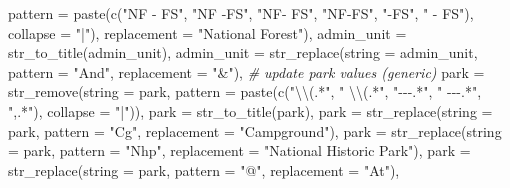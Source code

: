 \documentclass[
]{book}
\newenvironment{Shaded}{\begin{snugshade}}{\end{snugshade}}
\newcommand{\AttributeTok}[1]{\textcolor[rgb]{0.77,0.63,0.00}{#1}}
\newcommand{\CommentTok}[1]{\textcolor[rgb]{0.56,0.35,0.01}{\textit{#1}}}
\newcommand{\FunctionTok}[1]{\textcolor[rgb]{0.00,0.00,0.00}{#1}}
\newcommand{\NormalTok}[1]{#1}
\newcommand{\SpecialCharTok}[1]{\textcolor[rgb]{0.00,0.00,0.00}{#1}}
\newcommand{\StringTok}[1]{\textcolor[rgb]{0.31,0.60,0.02}{#1}}
\begin{document}
\begin{Shaded}
\begin{Highlighting}[]
                             \AttributeTok{pattern =} \FunctionTok{paste}\NormalTok{(}\FunctionTok{c}\NormalTok{(}\StringTok{"NF {-} FS"}\NormalTok{, }\StringTok{"NF {-}FS"}\NormalTok{, }
                                               \StringTok{"NF{-} FS"}\NormalTok{, }\StringTok{"NF{-}FS"}\NormalTok{, }
                                               \StringTok{"{-}FS"}\NormalTok{, }\StringTok{" {-} FS"}\NormalTok{), }
                                             \AttributeTok{collapse =} \StringTok{"|"}\NormalTok{),}
                             \AttributeTok{replacement =} \StringTok{"National Forest"}\NormalTok{),}
    \AttributeTok{admin\_unit =} \FunctionTok{str\_to\_title}\NormalTok{(admin\_unit),}
    \AttributeTok{admin\_unit =} \FunctionTok{str\_replace}\NormalTok{(}\AttributeTok{string =}\NormalTok{ admin\_unit,}
                             \AttributeTok{pattern =} \StringTok{"And"}\NormalTok{,}
                             \AttributeTok{replacement =} \StringTok{"\&"}\NormalTok{),}
    \CommentTok{\# update park values (generic)}
    \AttributeTok{park =} \FunctionTok{str\_remove}\NormalTok{(}\AttributeTok{string =}\NormalTok{ park,}
                      \AttributeTok{pattern =} \FunctionTok{paste}\NormalTok{(}\FunctionTok{c}\NormalTok{(}\StringTok{"}\SpecialCharTok{\textbackslash{}\textbackslash{}}\StringTok{(.*"}\NormalTok{, }\StringTok{" }\SpecialCharTok{\textbackslash{}\textbackslash{}}\StringTok{(.*"}\NormalTok{,}
                                        \StringTok{"{-}{-}{-}.*"}\NormalTok{, }\StringTok{" {-}{-}{-}.*"}\NormalTok{,}
                                        \StringTok{",.*"}\NormalTok{), }
                                      \AttributeTok{collapse =} \StringTok{"|"}\NormalTok{)),}
    \AttributeTok{park =} \FunctionTok{str\_to\_title}\NormalTok{(park),}
    \AttributeTok{park =} \FunctionTok{str\_replace}\NormalTok{(}\AttributeTok{string =}\NormalTok{ park,}
                       \AttributeTok{pattern =} \StringTok{"Cg"}\NormalTok{,}
                       \AttributeTok{replacement =} \StringTok{"Campground"}\NormalTok{),}
    \AttributeTok{park =} \FunctionTok{str\_replace}\NormalTok{(}\AttributeTok{string =}\NormalTok{ park,}
                       \AttributeTok{pattern =} \StringTok{"Nhp"}\NormalTok{,}
                       \AttributeTok{replacement =} \StringTok{"National Historic Park"}\NormalTok{),}
    \AttributeTok{park =} \FunctionTok{str\_replace}\NormalTok{(}\AttributeTok{string =}\NormalTok{ park,}
                       \AttributeTok{pattern =} \StringTok{"@"}\NormalTok{,}
                       \AttributeTok{replacement =} \StringTok{"At"}\NormalTok{),}

\end{Highlighting}
\end{Shaded}
\end{document}
